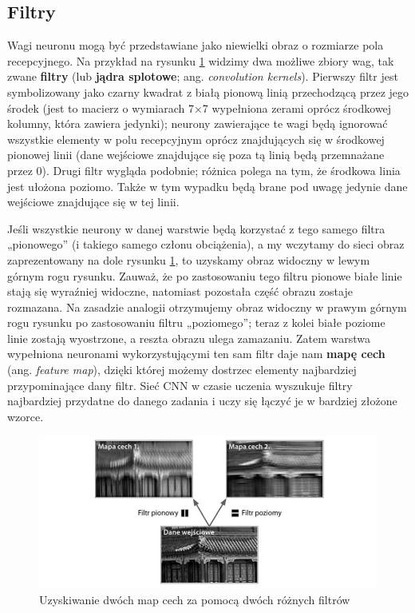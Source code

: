 \documentclass[12pt]{mwbk}
\theoremstyle{plain}
\theoremstyle{definition}
\theoremstyle{remark}
\newcommand\zrodlo[1]{\par\vspace{-3mm}{\small\textit{Źródło: }#1 }}
\begin{document}
\subsection{Filtry}

Wagi neuronu mogą być przedstawiane jako niewielki obraz o rozmiarze pola recepcyjnego. Na
przykład na rysunku \ref{fig:filtry} widzimy dwa możliwe zbiory wag, tak zwane \textbf{filtry} (lub \textbf{jądra splotowe}; ang. \emph{convolution kernels}). Pierwszy filtr jest symbolizowany jako czarny kwadrat z białą pionową
linią przechodzącą przez jego środek (jest to macierz o wymiarach 7×7 wypełniona zerami oprócz
środkowej kolumny, która zawiera jedynki); neurony zawierające te wagi będą ignorować wszystkie
elementy w polu recepcyjnym oprócz znajdujących się w środkowej pionowej linii (dane wejściowe
znajdujące się poza tą linią będą przemnażane przez 0). Drugi filtr wygląda podobnie; różnica
polega na tym, że środkowa linia jest ułożona poziomo. Także w tym wypadku będą brane pod uwagę
jedynie dane wejściowe znajdujące się w tej linii.

Jeśli wszystkie neurony w danej warstwie będą korzystać z tego samego filtra „pionowego” (i takiego
samego członu obciążenia), a my wczytamy do sieci obraz zaprezentowany na dole rysunku \ref{fig:filtry},
to uzyskamy obraz widoczny w lewym górnym rogu rysunku. Zauważ, że po zastosowaniu tego filtru
pionowe białe linie stają się wyraźniej widoczne, natomiast pozostała część obrazu zostaje rozmazana.
Na zasadzie analogii otrzymujemy obraz widoczny w prawym górnym rogu rysunku po zastosowaniu filtru „poziomego”; teraz z kolei białe poziome linie zostają wyostrzone, a reszta obrazu ulega zamazaniu. Zatem warstwa wypełniona neuronami wykorzystującymi ten sam filtr daje nam \textbf{mapę cech} (ang. \emph{feature map}), dzięki której możemy dostrzec elementy najbardziej przypominające dany filtr. Sieć CNN w czasie uczenia wyszukuje filtry najbardziej przydatne do danego zadania i uczy się łączyć je w bardziej złożone wzorce.

\begin{figure}[!h]
	\centering
	\includegraphics[width=0.9\linewidth]{rys/cnn_filtry.png}
	\caption{Uzyskiwanie dwóch map cech za pomocą dwóch różnych filtrów}
	\zrodlo{\cite{geron}}
	\label{fig:filtry}
\end{figure}
\end{document}
